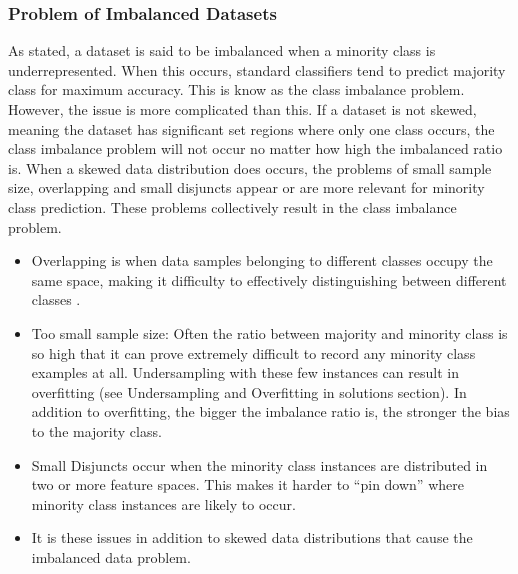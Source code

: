 \subsubsection{Problem of Imbalanced Datasets}
As stated, a dataset is said to be imbalanced when a minority class is underrepresented. When this occurs, standard classifiers tend to predict majority class for maximum accuracy. This is know as the class imbalance problem. However, the issue is more complicated than this. If a dataset is not skewed, meaning the dataset has significant set regions where only one class occurs, the class imbalance problem will not occur no matter how high the imbalanced ratio is. When a skewed data distribution does occurs, the problems of small sample size, overlapping and small disjuncts appear or are more relevant for minority class prediction. These problems collectively result in the class imbalance problem.
\begin{itemize}
    \item Overlapping is when data samples belonging to different classes occupy the same space, making it difficulty to effectively distinguishing between different classes \cite{Imbalsources1}.
    \item Too small sample size: Often the ratio between majority and minority class is so high that it can prove extremely difficult to record any minority class examples at all. Undersampling with these few instances can result in overfitting (see Undersampling and Overfitting in solutions section). In addition to overfitting, the bigger the imbalance ratio is, the stronger the bias to the majority class.
    \item Small Disjuncts occur when the minority class instances are distributed in two or more feature spaces. This makes it harder to “pin down” where minority class instances are likely to occur.
    \item It is these issues in addition to skewed data distributions that cause the imbalanced data problem. %
\end{itemize}


